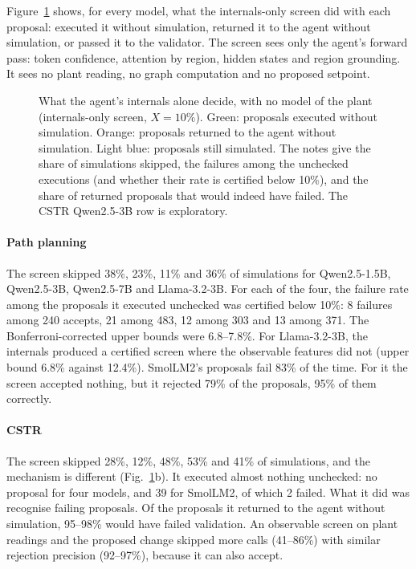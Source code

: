 
Figure~\ref{fig:replace} shows, for every model, what the internals-only screen did with each proposal: executed it
without simulation, returned it to the agent without simulation, or passed it to the validator. The screen sees
only the agent's forward pass: token confidence, attention by region, hidden states and region grounding. It sees
no plant reading, no graph computation and no proposed setpoint.

\begin{figure}[!htbp]
\centering

\caption{What the agent's internals alone decide, with no model of the plant (internals-only screen,
$X=10\%$). Green: proposals executed without simulation. Orange: proposals returned to the agent without
simulation. Light blue: proposals still simulated. The notes give the share of simulations skipped, the
failures among the unchecked executions (and whether their rate is certified below 10\%), and the share of
returned proposals that would indeed have failed. The CSTR Qwen2.5-3B row is exploratory.}
\label{fig:replace}
\end{figure}

\paragraph{Path planning} The screen skipped 38\%, 23\%, 11\% and 36\% of simulations for Qwen2.5-1.5B,
Qwen2.5-3B, Qwen2.5-7B and Llama-3.2-3B. For each of the four, the failure rate among the proposals it executed
unchecked was certified below 10\%: 8 failures among 240 accepts, 21 among 483, 12 among 303 and 13 among 371.
The Bonferroni-corrected upper bounds were 6.8--7.8\%. For Llama-3.2-3B, the internals produced a certified screen
where the observable features did not (upper bound 6.8\% against 12.4\%). SmolLM2's proposals fail 83\% of the
time. For it the screen accepted nothing, but it rejected 79\% of the proposals, 95\% of them correctly.

\paragraph{CSTR} The screen skipped 28\%, 12\%, 48\%, 53\% and 41\% of simulations, and the mechanism is different
(Fig.~\ref{fig:replace}b). It executed almost nothing unchecked: no proposal for four models, and 39 for SmolLM2,
of which 2 failed. What it did was recognise failing proposals. Of the proposals it returned to the agent without
simulation, 95--98\% would have failed validation. An observable screen on plant readings and the proposed change
skipped more calls (41--86\%) with similar rejection precision (92--97\%), because it can also accept.

